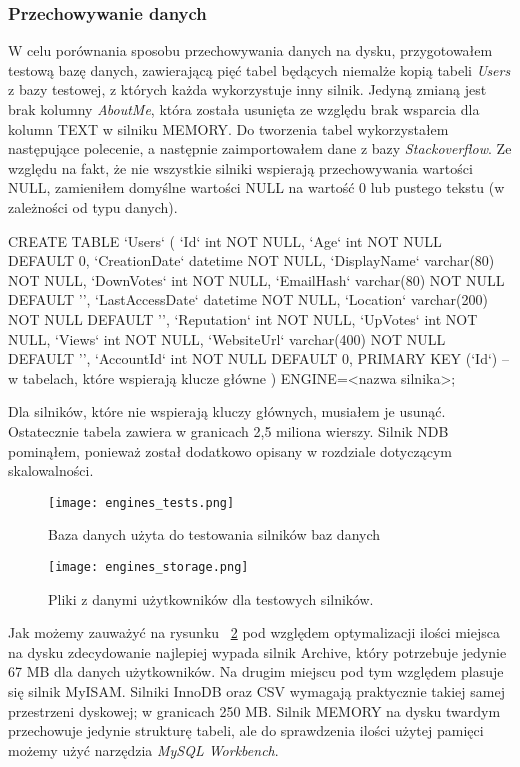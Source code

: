 \subsubsection{Przechowywanie danych}
W celu porównania sposobu przechowywania danych na dysku, przygotowałem testową bazę danych, zawierającą pięć tabel będących niemalże kopią tabeli \textit{Users} z bazy testowej, z których każda wykorzystuje inny silnik. Jedyną zmianą jest brak kolumny \textit{AboutMe}, która została usunięta ze względu brak wsparcia dla kolumn TEXT w silniku MEMORY. Do tworzenia tabel wykorzystałem następujące polecenie, a następnie zaimportowałem dane z bazy \textit{Stackoverflow}. Ze względu na fakt, że nie wszystkie silniki wspierają przechowywania wartości NULL, zamieniłem domyślne wartości NULL na wartość 0 lub pustego tekstu (w zależności od typu danych).
\begin{spverbatim}
	CREATE TABLE `Users` (
	`Id` int NOT NULL,
	`Age` int NOT NULL DEFAULT 0,
	`CreationDate` datetime NOT NULL,
	`DisplayName` varchar(80) NOT NULL,
	`DownVotes` int NOT NULL,
	`EmailHash` varchar(80) NOT NULL DEFAULT '',
	`LastAccessDate` datetime NOT NULL,
	`Location` varchar(200) NOT NULL DEFAULT '',
	`Reputation` int NOT NULL,
	`UpVotes` int NOT NULL,
	`Views` int NOT NULL,
	`WebsiteUrl` varchar(400) NOT NULL DEFAULT '',
	`AccountId` int NOT NULL DEFAULT 0,
	PRIMARY KEY (`Id`) -- w tabelach, które wspierają klucze główne
	) ENGINE=<nazwa silnika>;
\end{spverbatim}
Dla silników, które nie wspierają kluczy głównych, musiałem je usunąć. Ostatecznie tabela zawiera w granicach 2,5 miliona wierszy. Silnik NDB pominąłem, ponieważ został dodatkowo opisany w rozdziale dotyczącym skalowalności.
\begin{figure}[!h]
	\caption{Baza danych użyta do testowania silników baz danych}
	\centering
	\texttt{[image: engines\_tests.png]}
	\label{fig:label}
\end{figure}
\begin{figure}[!h]
	\caption{Pliki z danymi użytkowników dla testowych silników.}
	\centering
	\texttt{[image: engines\_storage.png]}
	\label{fig:engines_storage}
\end{figure}
Jak możemy zauważyć na rysunku ~\ref{fig:engines_storage} pod względem optymalizacji ilości miejsca na dysku zdecydowanie najlepiej wypada silnik Archive, który potrzebuje jedynie 67 MB dla danych użytkowników. Na drugim miejscu pod tym względem plasuje się silnik MyISAM. Silniki InnoDB oraz CSV wymagają praktycznie takiej samej przestrzeni dyskowej; w granicach 250 MB. Silnik MEMORY na dysku twardym przechowuje jedynie strukturę tabeli, ale do sprawdzenia ilości użytej pamięci możemy użyć narzędzia \textit{MySQL Workbench}.
